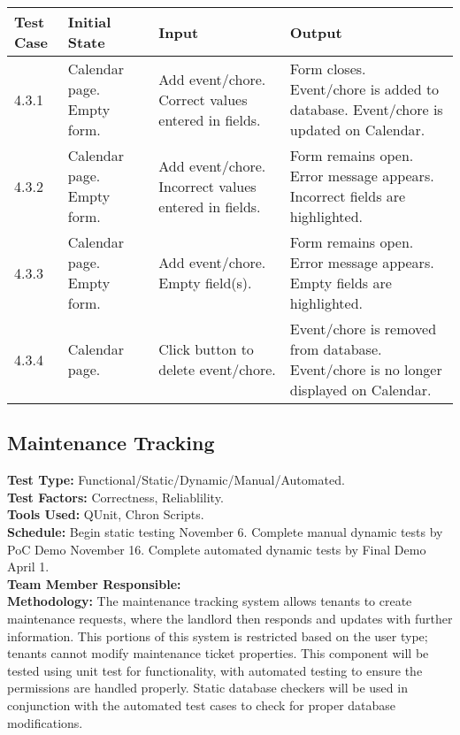 \documentclass[12pt]{article}
\begin{document}
\begin{longtable}{|p{2cm}|p{3cm}|p{5cm}|p{5cm}|}
\hline
\textbf{Test Case}  & \textbf{Initial State} & \textbf{Input} & \textbf{Output} \\ \hline
4.3.1 & Calendar page. Empty form. & Add event/chore. Correct values entered in fields. & Form closes. Event/chore is added to database. Event/chore is updated on Calendar. \\ 
\hline
4.3.2 & Calendar page. Empty form. & Add event/chore. Incorrect values entered in fields. & Form remains open. Error message appears. Incorrect fields are highlighted. \\
\hline
4.3.3 & Calendar page. Empty form. & Add event/chore. Empty field(s). & Form remains open. Error message appears. Empty fields are highlighted. \\
\hline
4.3.4 & Calendar page. & Click button to delete event/chore.  & Event/chore is removed from database. Event/chore is no longer displayed on Calendar. \\
\hline
\end{longtable}

\subsection{Maintenance Tracking}
\textbf{Test Type:} Functional/Static/Dynamic/Manual/Automated. \\
\textbf{Test Factors:} Correctness, Reliablility. \\
\textbf{Tools Used:} QUnit, Chron Scripts. \\
\textbf{Schedule:} Begin static testing November 6. Complete manual dynamic tests by PoC Demo November 16. Complete automated dynamic tests by Final Demo April 1. \\
\textbf{Team Member Responsible:} \\
\textbf{Methodology:} The maintenance tracking system allows tenants to create maintenance requests, where the landlord then responds and updates with further information. This portions of this system is restricted based on the user type; tenants cannot modify maintenance ticket properties. This component will be tested using unit test for functionality, with automated testing to ensure the permissions are handled properly. Static database checkers will be used in conjunction with the automated test cases to check for proper database modifications.
\end{document}
